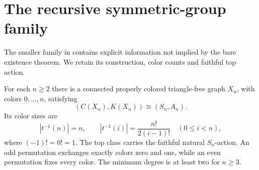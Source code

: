 \section{The recursive symmetric-group family}
\label{sec:family}
The smaller family in \cite[Example 5.2]{DMV} contains explicit information
not implied by the bare existence theorem. We retain its construction, color
counts and faithful top action.

\begin{theorem}\label{R.SymmetricFamily}
For each $n\geq2$ there is a connected properly colored triangle-free graph
$X_n$, with colors $0,\ldots,n$, satisfying
\[
 (C(X_n),K(X_n))\cong(S_n,A_n).
\]
Its color sizes are
\begin{equation}\label{eq:class-sizes}
 |t^{-1}(n)|=n,\qquad
 |t^{-1}(i)|=\frac{n!}{2(i-1)!}\quad(0\leq i<n),
\end{equation}
where $(-1)!=0!=1$. The top class carries the faithful natural $S_n$-action.
An odd permutation exchanges exactly colors zero and one, while an even
permutation fixes every color. The minimum degree is at least two for $n\geq3$.
\end{theorem}
